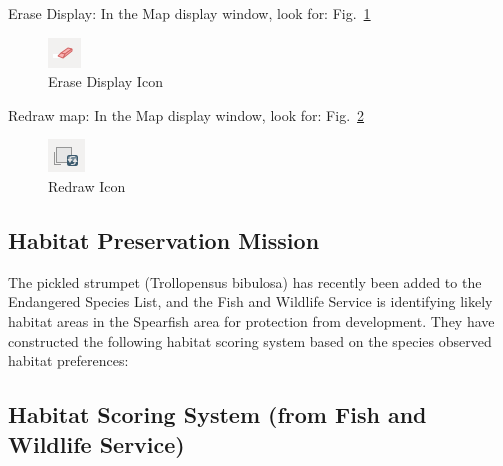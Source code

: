 Erase Display:
In the Map display window, look for:   Fig.~\ref{fig:grass019}

\begin{figure}[htbp]
   \centering
   \includegraphics[scale=1]{grass019.png}
   \caption{Erase Display Icon}
   \label{fig:grass019}
\end{figure}

Redraw map:
In the Map display window, look for:   Fig.~\ref{fig:grass020}

\begin{figure}[htbp]
   \centering
   \includegraphics[scale=1]{grass020.png}
   \caption{Redraw Icon}
   \label{fig:grass020}
\end{figure}

\subsection{Habitat Preservation Mission}
The pickled strumpet (Trollopensus bibulosa) has recently been added to the Endangered Species List, and the Fish and Wildlife Service is identifying likely habitat areas in the Spearfish area for protection from development. They have constructed the following habitat scoring system based on the species observed habitat preferences:

\subsection{Habitat Scoring System (from Fish and Wildlife Service) }

